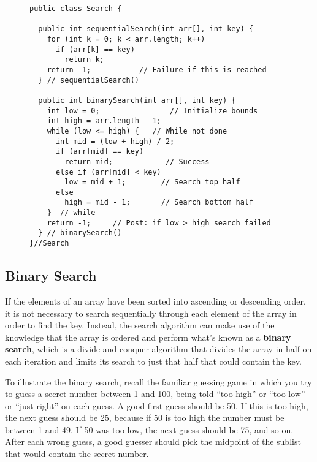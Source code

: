 \begin{figure}[bht]
\jjjprogstart
\begin{jjjlisting}
\begin{lstlisting}
public class Search {

  public int sequentialSearch(int arr[], int key) {
    for (int k = 0; k < arr.length; k++)
      if (arr[k] == key)
        return k;
    return -1;           // Failure if this is reached
  } // sequentialSearch()

  public int binarySearch(int arr[], int key) {
    int low = 0;                // Initialize bounds
    int high = arr.length - 1;
    while (low <= high) {   // While not done
      int mid = (low + high) / 2;
      if (arr[mid] == key)
        return mid;            // Success
      else if (arr[mid] < key)
        low = mid + 1;        // Search top half
      else
        high = mid - 1;       // Search bottom half
    }  // while
    return -1;     // Post: if low > high search failed
  } // binarySearch()
}//Search
\end{lstlisting}
\end{jjjlisting}
\end{figure}


\subsection{Binary Search}
\noindent If the elements of an array have been sorted into ascending or
descending order, it is not necessary to search sequentially through
each element of the array in order to find the
key.  Instead, the search algorithm can make use of the knowledge that
the array is ordered and perform what's known as a {\bf
binary search}, which is a
divide-and-conquer algorithm that divides
the array in half on each iteration and limits its search to just that
half that could contain the key.

To illustrate the binary search, recall the familiar guessing game in
which you try to guess a secret number between 1 and 100, being told
``too high'' or ``too low'' or ``just right'' on each guess.   A good
first guess should be 50. If this is too high, the next guess should
be 25, because if 50 is too high the number must be between 1 and 49.
If 50 was too low, the next guess should be 75, and so on.   After each
wrong guess, a good guesser should pick the midpoint of the sublist
that would contain the secret number.

